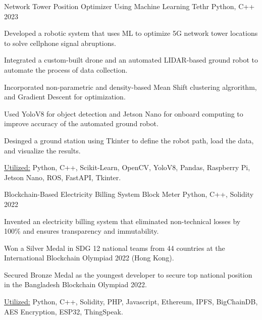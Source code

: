 

\begin{cventries}

  \cventryprojects
    {Network Tower Position Optimizer Using Machine Learning} %
    {Tethr} %
    {Python, C++} %
    {2023} %
    {
      \begin{cvitems} %
        \item {Developed a robotic system that uses ML to optimize 5G network tower locations 
        to solve cellphone signal abruptions.}
        \item {Integrated a custom-built drone and an automated LIDAR-based ground robot to automate the process of 
        data collection.}
        \item {Incorporated non-parametric and density-based Mean Shift clustering algrorithm, and Gradient Descent 
        for optimization.}
        \item {Used YoloV8 for object detection and Jetson Nano for onboard computing to improve accuracy of the automated 
        ground robot.}
        \item {Desinged a ground station using Tkinter to define the robot path, load the data, and visualize the results.}
        \item {\underline{Utilized:} Python, C++, Scikit-Learn, OpenCV, YoloV8, Pandas, Raspberry Pi, Jetson Nano, ROS, FastAPI, Tkinter.}
      \end{cvitems}
      }
      
      \cventryprojects
      {Blockchain-Based Electricity Billing System } %
      {Block Meter} %
      {Python, C++, Solidity} %
      {2022} %
      {
        \begin{cvitems} %
          \item {Invented an electricity billing system that eliminated non-technical losses by 100\% and ensures transparency and immutability.}
          \item {Won a Silver Medal in SDG 12 national teams from 44 countries at the International Blockchain Olympiad 2022 (Hong Kong).}
          \item {Secured Bronze Medal as the youngest developer to secure top national position in the Bangladesh Blockchain Olympiad 2022.}
          \item {\underline{Utilized:} Python, C++, Solidity, PHP, Javascript, Ethereum, IPFS, BigChainDB, AES Encryption, ESP32, ThingSpeak.}
        \end{cvitems}
        }
      

\end{cventries}
